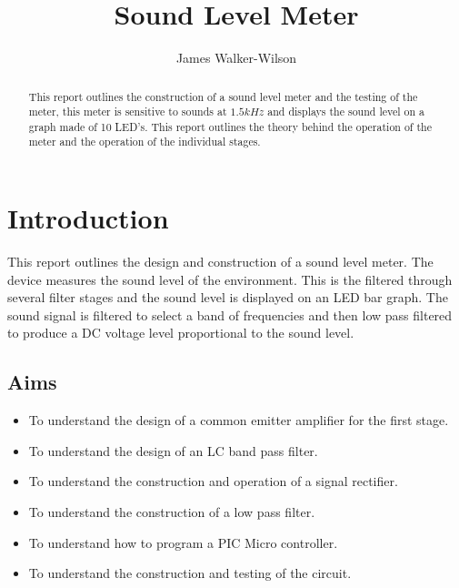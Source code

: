 \documentclass[10pt,a4paper]{article}
\author{James Walker-Wilson}
\title{Sound Level Meter}
\begin{document}
\maketitle
\newpage

\begin{abstract}
This report outlines the construction of a sound level meter and the testing of the meter, this meter is sensitive to sounds at $1.5kHz$ and displays the sound level on a graph made of 10 LED's. This report outlines the theory behind the operation of the meter and the operation of the individual stages. 
\end{abstract}

\section{Introduction}
This report outlines the design and construction of a sound level meter. The device measures the sound level of the environment. This is the filtered through several filter stages and the sound level is displayed on an LED bar graph. The sound signal is filtered to select a band of frequencies and then low pass filtered to produce a DC voltage level proportional to the sound level.  

\subsection{Aims}
\begin{itemize}
  \item To understand the design of a common emitter amplifier for the first stage.
  \item To understand the design of an LC band pass filter.
  \item To understand the construction and operation of a signal rectifier.
  \item To understand the construction of a low pass filter.
  \item To understand how to program a PIC Micro controller.
  \item To understand the construction and testing of the circuit.  

  \end{itemize}
\end{document}
